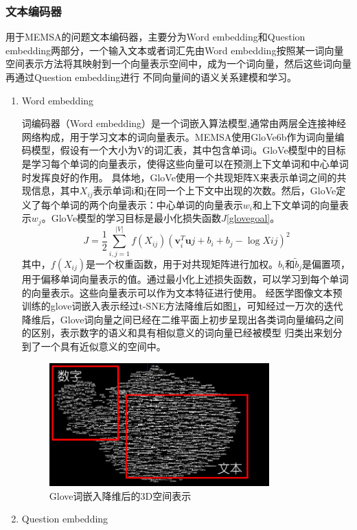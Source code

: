 \subsubsection*{文本编码器}
用于MEMSA的问题文本编码器，主要分为Word embedding和Question embedding两部分，一个输入文本或者词汇先由Word embedding按照某一词向量空间表示方法将其映射到一个向量表示空间中，成为一个词向量，然后这些词向量再通过Question embedding进行
不同向量间的语义关系建模和学习。
\begin{enumerate}[topsep = 0 pt, itemsep= 0 pt, parsep=0pt, partopsep=0pt, leftmargin=0pt, itemindent=44pt, labelsep=6pt, listparindent=22pt, label=(\arabic*)]
	\item Word embedding
	
	词编码器（Word embedding）是一个词嵌入算法模型,通常由两层全连接神经网络构成，用于学习文本的词向量表示。MEMSA使用GloVe6b作为词向量编码模型，假设有一个大小为V的词汇表，其中包含单词i。GloVe模型中的目标是学习每个单词的向量表示，使得这些向量可以在预测上下文单词和中心单词时发挥良好的作用。
	具体地，GloVe使用一个共现矩阵X来表示单词之间的共现信息，其中$X_{ij}$表示单词i和j在同一个上下文中出现的次数。然后，GloVe定义了每个单词的两个向量表示：中心单词的向量表示$w_i$和上下文单词的向量表示$w_j$。GloVe模型的学习目标是最小化损失函数$J$\eqref{glovegoal}。
	\begin{equation}
		\label{glovegoal}
		J = \frac{1}{2} \sum_{i,j=1}^{|V|} f(X_{ij})(\mathbf{v}_i^T\mathbf{u}j + b_i + b_j - \log X{ij})^2
	\end{equation}
	其中，$f(X_{ij})$是一个权重函数，用于对共现矩阵进行加权。$b_i$和$\tilde{b}_j$是偏置项，用于偏移单词向量表示的值。通过最小化上述损失函数，可以学习到每个单词的向量表示。这些向量表示可以作为文本特征进行使用。
	经医学图像文本预训练的glove词嵌入表示经过t-SNE方法降维后如图\ref{fig:Glove}，可知经过一万次的迭代降维后，Glove词向量之间已经在二维平面上初步呈现出各类词向量编码之间的区别，表示数字的语义和具有相似意义的词向量已经被模型
	归类出来划分到了一个具有近似意义的空间中。
	\begin{figure}[htbp]
		\centering	
		\includegraphics[width=0.8\textwidth]{Fig/myfig/chapter3/glove.png}  %
		\caption{\label{fig:Glove}Glove词嵌入降维后的3D空间表示} 
	\end{figure}
	\item Question embedding
	

\end{enumerate}

